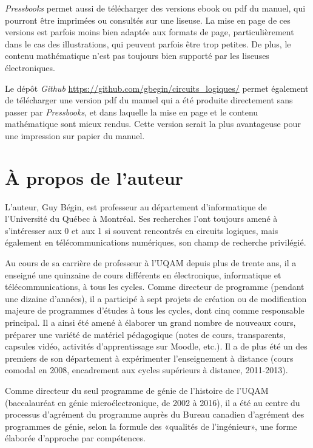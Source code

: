 \documentclass[letter, oneside]{book}
\begin{document}
\emph{Pressbooks} permet aussi de télécharger des versions ebook ou pdf du
manuel, qui pourront être imprimées ou consultés sur une liseuse. La
mise en page de ces versions est parfois moins bien adaptée aux
formats de page, particulièrement dans le cas des illustrations, qui
peuvent parfois être trop petites.  De plus, le contenu mathématique
n'est pas toujours bien supporté par les liseuses électroniques.

Le dépôt \emph{Github} \url{https://github.com/gbegin/circuits\_logiques/} permet
également de télécharger une version pdf du manuel qui a été produite
directement sans passer par \emph{Pressbooks}, et dans laquelle la mise en
page et le contenu mathématique sont mieux rendus. Cette version
serait la plus avantageuse pour une impression sur papier du manuel.

\section*{À propos de l'auteur}
\label{sec:org3f86266}

L'auteur, Guy Bégin, est professeur au département d'informatique de
l'Université du Québec à Montréal. Ses recherches l'ont toujours amené
à s'intéresser aux 0 et aux 1 si souvent rencontrés en circuits
logiques, mais également en télécommunications numériques, son champ
de recherche privilégié.

Au cours de sa carrière de professeur à l'UQAM depuis plus de trente
ans, il a enseigné une quinzaine de cours différents en électronique,
informatique et télécommunications, à tous les cycles. Comme directeur
de programme (pendant une dizaine d'années), il a participé à sept
projets de création ou de modification majeure de programmes d'études
à tous les cycles, dont cinq comme responsable principal. Il a ainsi
été amené à élaborer un grand nombre de nouveaux cours, préparer une
variété de matériel pédagogique (notes de cours, transparents,
capsules vidéo, activités d'apprentissage sur Moodle, etc.). Il a de
plus été un des premiers de son département à expérimenter
l'enseignement à distance (cours comodal en 2008, encadrement
aux cycles supérieurs à distance, 2011-2013).

Comme directeur du seul programme de génie de l'histoire de l'UQAM
(baccalauréat en génie microélectronique, de 2002 à 2016), il a été au
centre du processus d'agrément du programme auprès du Bureau canadien
d'agrément des programmes de génie, selon la formule des «qualités de
l'ingénieur», une forme élaborée d'approche par compétences.
\end{document}
